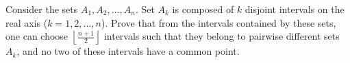 Consider the sets $A_1,A_2,\dots,A_n$. Set $A_k$ is composed of $k$ disjoint intervals on the real axis ($k=1,2,\dots,n$). Prove that from the intervals contained by these sets, one can choose $\left\lfloor\frac{n+1}2\right\rfloor$ intervals such that they belong to pairwise different sets $A_k$, and no two of these intervals have a common point.